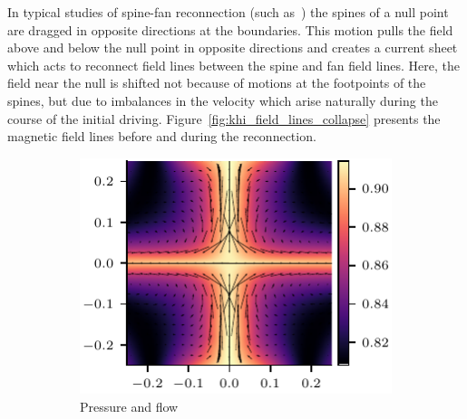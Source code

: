 In typical studies of spine-fan reconnection (such as~\cite{pontinCurrentSheetFormation2007}) the spines of a null point are dragged in opposite directions at the boundaries. This motion pulls the field above and below the null point in opposite directions and creates a current sheet which acts to reconnect field lines between the spine and fan field lines. Here, the field near the null is shifted not because of motions at the footpoints of the spines, but due to imbalances in the velocity which arise naturally during the course of the initial driving. Figure~\ref{fig:khi_field_lines_collapse} presents the magnetic field lines before and during the reconnection.

\begin{figure}[t]
  \centering
    \begin{subfigure}{0.49\textwidth}
      \includegraphics[width=\linewidth]{v-4r-4-pressure-flow-30.pdf}
      \caption{Pressure and flow}
      \label{fig:v-4r-4-pressure-flow-30}
    \end{subfigure}
    \hfill
    \begin{subfigure}{0.32\textwidth}

\end{subfigure}
\end{figure}
